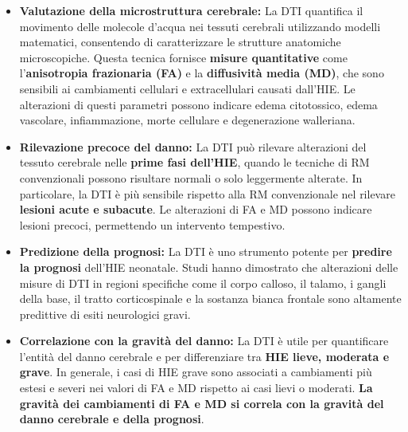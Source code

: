 \begin{itemize}
	\item
	\textbf{Valutazione della microstruttura cerebrale:} La DTI quantifica il movimento delle molecole d'acqua nei tessuti cerebrali utilizzando modelli matematici, consentendo di caratterizzare le strutture anatomiche microscopiche. Questa tecnica fornisce \textbf{misure quantitative} come l'\textbf{anisotropia frazionaria (FA)} e la \textbf{diffusività media (MD)}, che sono sensibili ai cambiamenti cellulari e extracellulari causati dall'HIE. Le alterazioni di questi parametri possono indicare edema citotossico, edema vascolare, infiammazione, morte cellulare e degenerazione walleriana.
	\item
	\textbf{Rilevazione precoce del danno:} La DTI può rilevare alterazioni del tessuto cerebrale nelle \textbf{prime fasi dell'HIE}, quando le tecniche di RM convenzionali possono risultare normali o solo leggermente alterate. In particolare, la DTI è più sensibile rispetto alla RM convenzionale nel rilevare \textbf{lesioni acute e subacute}. Le alterazioni di FA e MD possono indicare lesioni precoci, permettendo un intervento tempestivo.
	\item
	\textbf{Predizione della prognosi:} La DTI è uno strumento potente per \textbf{predire la prognosi} dell'HIE neonatale. Studi hanno dimostrato che alterazioni delle misure di DTI in regioni specifiche come il corpo calloso, il talamo, i gangli della base, il tratto corticospinale e la sostanza bianca frontale sono altamente predittive di esiti neurologici gravi.
	\item
	\textbf{Correlazione con la gravità del danno:} La DTI è utile per quantificare l'entità del danno cerebrale e per differenziare tra \textbf{HIE lieve, moderata e grave}. In generale, i casi di HIE grave sono associati a cambiamenti più estesi e severi nei valori di FA e MD rispetto ai casi lievi o moderati. \textbf{La gravità dei cambiamenti di FA e MD si correla con la gravità del danno cerebrale e della prognosi}.
	

\end{itemize}
